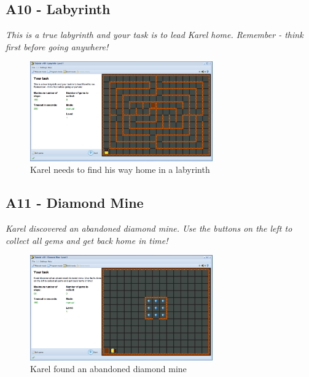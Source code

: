 \documentclass[article,A4,12pt]{llncs}
\begin{document}
\subsection{A10 - Labyrinth}

{\em This is a true labyrinth and your task is to lead Karel 
home. Remember - think first before going anywhere!}

\begin{figure}[!ht]
\begin{center}
\includegraphics[width=0.7\textwidth]{img/a10.png}
\end{center}
\vspace{-4mm}
\caption{Karel needs to find his way home in a labyrinth}
\label{fig:a10}
\vspace{-4mm}
\end{figure}
\noindent


\subsection{A11 - Diamond Mine}

{\em Karel discovered an abandoned diamond mine. Use the buttons
on the left to collect all gems and get back home in time!}

\begin{figure}[!ht]
\begin{center}
\includegraphics[width=0.7\textwidth]{img/a11.png}
\end{center}
\vspace{-4mm}
\caption{Karel found an abandoned diamond mine}
\label{fig:a11}
\vspace{-4mm}
\end{figure}
\noindent
\newpage
\end{document}
